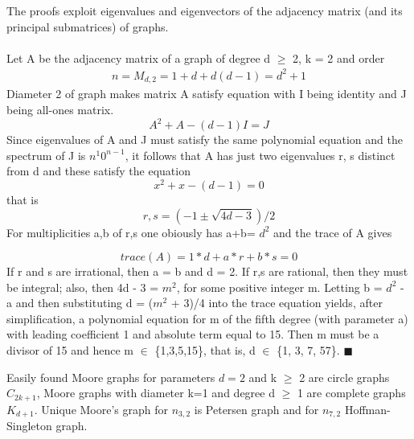\documentclass[a4paper,11pt,twoside]{report}%
\begin{document}
The proofs exploit eigenvalues and eigenvectors of the adjacency matrix (and its principal submatrices) of graphs. \\ \\
Let A be the adjacency matrix of a graph of degree d $\geq$ 2, k = 2 and order
\begin{align*}
	n = M_{d,2} = 1 + d + d(d - 1) = d^2 + 1
\end{align*}
Diameter 2 of graph makes matrix A satisfy equation with I being identity and J being all-ones matrix.
\begin{equation*}
	A^2 + A - (d - 1)I = J
\end{equation*}
Since eigenvalues of A and J must satisfy the same polynomial equation and the spectrum of J is $n^{1}0^{n-1}$, it follows that A has just two eigenvalues r, s distinct from d and these satisfy the equation
\begin{equation*}
	x^2 + x - (d - 1) = 0 
\end{equation*}
that is 
\begin{equation*}
	r,s = (-1 \pm \sqrt{4d - 3})/2  
\end{equation*}
For multiplicities a,b of r,s one obiously has a+b= $d^2$ and the trace of A gives  

\begin{equation*}
	trace(A) = 1 \ast d + a \ast r + b \ast s = 0 
\end{equation*}
If r and s are irrational, then a = b and d = 2. If r,s are rational, then they must be integral; also, then 4d - 3 = $m^{2}$, for some positive integer m. Letting b = $d^{2}$ - a and then substituting d = ($m^2$ + 3)/4 into the trace equation yields, after simplification, a polynomial equation for m of the fifth degree (with parameter a) with leading coefficient 1 and absolute term equal to 15. Then m must be a divisor of 15 and hence m $\in$ \{1,3,5,15\}, that is, d $\in$ \{1, 3, 7, 57\}.
$\blacksquare$

Easily found Moore graphs for parameters $d=2$ and k $\geq$ 2 are circle graphs $C_{2k+1}$, Moore graphs with diameter k=1 and degree d $\geq$ 1 are complete graphs $K_{d+1}$. Unique Moore's graph for $n_{3,2}$ is Petersen graph and for $n_{7,2}$ Hoffman-Singleton graph.
\end{document}
